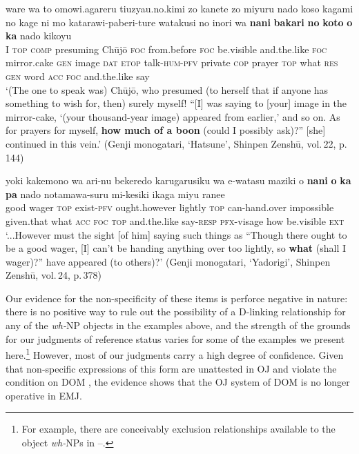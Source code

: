 \documentclass[output=paper]{LSP/langsci}
\begin{document}
\begin{exe}
\ex%
\label{07-fr-ex:56}
\gll ware wa to omowi.agareru tiuzyau.no.kimi zo kanete zo miyuru nado koso kagami no kage ni mo katarawi-paberi-ture watakusi no inori wa \textbf{nani} \textbf{bakari} \textbf{no} \textbf{koto} \textbf{o} \textbf{ka} nado kikoyu\\
I \textsc{top} \textsc{comp} presuming Chūjō \textsc{foc} from.before \textsc{foc} be.visible and.the.like \textsc{foc} mirror.cake \textsc{gen} image \textsc{dat} \textsc{etop} talk-\textsc{hum}-\textsc{pfv} private \textsc{cop} prayer \textsc{top} what \textsc{res} \textsc{gen} word \textsc{acc} \textsc{foc}  and.the.like say\\
\glt ‘(The one to speak was) Chūjō, who presumed (to herself that if anyone has something to wish for, then) surely myself! “[I] was saying to [your] image in the mirror-cake, ‘(your thousand-year image) appeared from earlier,’ and so on. As for prayers for myself, \textbf{how much of a boon} (could I possibly ask)?” [she] continued in this vein.’  (Genji monogatari, ‘Hatsune’, Shinpen Zenshū, vol.\,22, p.\,144)
\end{exe}

\begin{exe}
\ex%
\label{07-fr-ex:57}
\gll yoki kakemono wa ari-nu bekeredo karugarusiku wa e-watasu maziki o \textbf{nani} \textbf{o} \textbf{ka} \textbf{pa} nado notamawa-suru mi-kesiki ikaga miyu ranee\\
good wager \textsc{top} exist-\textsc{pfv} ought.however lightly \textsc{top} can-hand.over impossible given.that what \textsc{acc} \textsc{foc} \textsc{top}  and.the.like say-\textsc{resp} \textsc{pfx}{}-visage how be.visible \textsc{ext}\\
\glt ‘...However must the sight [of him] saying such things as “Though there ought to be a good wager, [I] can't be handing anything over too lightly, so \textbf{what} (shall I wager)?” have appeared (to others)?’ (Genji monogatari, ‘Yadorigi’, Shinpen Zenshū, vol.\,24, p.\,378)
\end{exe}

Our evidence for the non-specificity of these items is perforce negative in nature: there is no positive way to rule out the possibility of a D-linking relationship for any of the \textit{wh-}NP objects in the examples above, and the strength of the grounds for our judgments of reference status varies for some of the examples we present here.\footnote{For example, there are conceivably exclusion relationships available to the object \textit{wh-}NPs in --.} However, most of our judgments carry a high degree of confidence. Given that non-specific expressions of this form are unattested in OJ   and violate the condition on DOM , the evidence shows that the OJ system of DOM is no longer operative in EMJ. 
\end{document}
